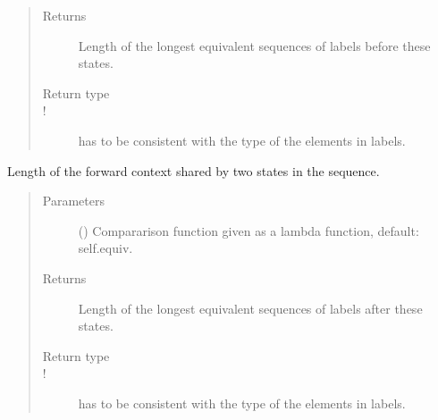 \documentclass[letterpaper,10pt,english]{sphinxmanual}
\begin{document}
\begin{fulllineitems}
\begin{fulllineitems}
\begin{quote}
\begin{description}
\item[{Returns}] \leavevmode
Length of the longest equivalent sequences of labels before these states.

\item[{Return type}] \leavevmode
{}

\item[{!}] \leavevmode
{} has to be consistent with the type of the elements in labels.

\end{description}\end{quote}

\end{fulllineitems}


\begin{fulllineitems}
\label{\detokenize{index:Navigator.Navigator.length_common_forward_context}}
Length of the forward context shared by two states in the sequence.
\begin{quote}\begin{description}
\item[{Parameters}] \leavevmode
{} () \textendash{} Compararison function given as a lambda function, default: self.equiv.

\item[{Returns}] \leavevmode
Length of the longest equivalent sequences of labels after these states.

\item[{Return type}] \leavevmode
{}

\item[{!}] \leavevmode
{} has to be consistent with the type of the elements in labels.

\end{description}\end{quote}

\end{fulllineitems}



\end{fulllineitems}
\end{document}
